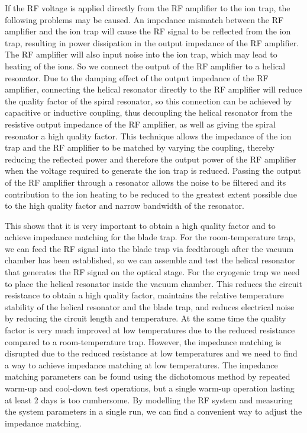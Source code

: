 If the RF voltage is applied directly from the RF amplifier to the ion trap, the following problems may be caused. An impedance mismatch between the RF amplifier and the ion trap will cause the RF signal to be reflected from the ion trap, resulting in power dissipation in the output impedance of the RF amplifier. The RF amplifier will also input noise into the ion trap, which may lead to heating of the ions. So we connect the output of the RF amplifier to a helical resonator. Due to the damping effect of the output impedance of the RF amplifier, connecting the helical resonator directly to the RF amplifier will reduce the quality factor of the spiral resonator, so this connection can be achieved by capacitive or inductive coupling, thus decoupling the helical resonator from the resistive output impedance of the RF amplifier, as well as giving the spiral resonator a high quality factor. This technique allows the impedance of the ion trap and the RF amplifier to be matched by varying the coupling, thereby reducing the reflected power and therefore the output power of the RF amplifier when the voltage required to generate the ion trap is reduced. Passing the output of the RF amplifier through a resonator allows the noise to be filtered and its contribution to the ion heating to be reduced to the greatest extent possible due to the high quality factor and narrow bandwidth of the resonator.

This shows that it is very important to obtain a high quality factor and to achieve impedance matching for the blade trap. For the room-temperature trap, we can feed the RF signal into the blade trap via feedthrough after the vacuum chamber has been established, so we can assemble and test the helical resonator that generates the RF signal on the optical stage. For the cryogenic trap we need to place the helical resonator inside the vacuum chamber. This reduces the circuit resistance to obtain a high quality factor, maintains the relative temperature stability of the helical resonator and the blade trap, and reduces electrical noise by reducing the circuit length and temperature. At the same time the quality factor is very much improved at low temperatures due to the reduced resistance compared to a room-temperature trap. However, the impedance matching is disrupted due to the reduced resistance at low temperatures and we need to find a way to achieve impedance matching at low temperatures. The impedance matching parameters can be found using the dichotomous method by repeated warm-up and cool-down test operations, but a single warm-up operation lasting at least 2 days is too cumbersome. By modelling the RF system and measuring the system parameters in a single run, we can find a convenient way to adjust the impedance matching.
